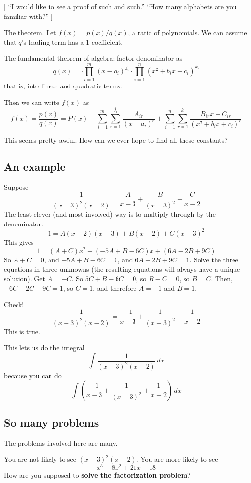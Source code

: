 \documentclass[12pt]{article}
\begin{document}
[ ``I would like to see a proof of such and such.''  ``How many
alphabets are you familiar with?'' ]

The theorem.  Let $f(x) = p(x)/q(x)$, a ratio of polynomials.  We can
assume that $q$'s leading term has a $1$ coefficient.

The fundamental theorem of algebra: factor denominator as
$$
q(x) =  \cdot \prod_{i=1}^m (x-a_i)^{j_i} \cdot \prod_{i=1}^n (x^2 + b_i x + c_i)^{k_i}
$$
that is, into linear and quadratic terms.

Then we can write $f(x)$ as
$$
f(x) = \frac{p(x)}{q(x)} = P(x) + \sum_{i=1}^m\sum_{r=1}^{j_i} \frac{A_{ir}}{(x-a_i)^r} + \sum_{i=1}^n\sum_{r=1}^{k_i} \frac{B_{ir}x+C_{ir}}{(x^2+b_ix+c_i)^r}
$$

This seems pretty awful.  How can we ever hope to find all these constants?

\subsection*{An example}

Suppose
$$
\frac{1}{(x-3)^2 (x-2)} = \frac{A}{x-3} + \frac{B}{(x-3)^2} + \frac{C}{x-2}
$$
The least clever (and most involved) way is to multiply through by the denominator:
$$
1 = A(x-2)(x-3) + B(x-2) + C(x-3)^2
$$
This gives
$$
1 = (A+C) x^2 + (-5 A + B - 6 C)x+(6 A-2 B+9 C)
$$
So $A + C = 0$, and $-5A + B - 6C = 0$, and $6A - 2B + 9C = 1$.
Solve the three equations in three unknowns (the resulting equations
will always have a unique solution).
Get $A = -C$.  So $5C + B - 6C = 0$, so $B - C = 0$, so $B = C$.
Then, $-6C - 2C + 9C = 1$, so $C = 1$, and therefore $A = -1$ and $B = 1$.

Check!
$$
\frac{1}{(x-3)^2 (x-2)} = \frac{-1}{x-3} + \frac{1}{(x-3)^2} + \frac{1}{x-2}
$$
This is true.

This lets us do the integral
$$
\int \frac{1}{(x-3)^2 (x-2)} \, dx
$$
because you can do
$$
\int \left( \frac{-1}{x-3} + \frac{1}{(x-3)^2} + \frac{1}{x-2} \right) \, dx
$$

\subsection*{So many problems}

The problems involved here are many.

You are not likely to see $(x-3)^2 (x-2)$.  You are more likely to see
$$
x^3-8 x^2+21 x-18
$$
How are you supposed to \textbf{solve the factorization problem}?
\end{document}
